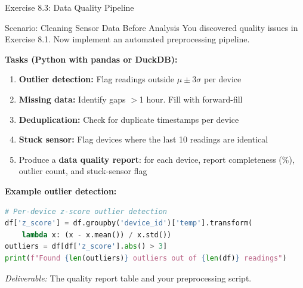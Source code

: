 \documentclass[aspectratio=169,11pt]{beamer}
\begin{document}
\begin{frame}[fragile]{Exercise 8.3: Data Quality Pipeline}
    \begin{block}{Scenario: Cleaning Sensor Data Before Analysis}
        You discovered quality issues in Exercise 8.1. Now implement an automated preprocessing pipeline.
    \end{block}

    \vspace{0.2cm}
    \textbf{Tasks (Python with pandas or DuckDB):}
    \begin{enumerate}
        \item \textbf{Outlier detection:} Flag readings outside $\mu \pm 3\sigma$ per device
        \item \textbf{Missing data:} Identify gaps $>$1 hour. Fill with forward-fill
        \item \textbf{Deduplication:} Check for duplicate timestamps per device
        \item \textbf{Stuck sensor:} Flag devices where the last 10 readings are identical
        \item Produce a \textbf{data quality report}: for each device, report completeness (\%), outlier count, and stuck-sensor flag
    \end{enumerate}

    \vspace{0.1cm}
    \textbf{Example outlier detection:}
\begin{lstlisting}[language=Python]
# Per-device z-score outlier detection
df['z_score'] = df.groupby('device_id')['temp'].transform(
    lambda x: (x - x.mean()) / x.std())
outliers = df[df['z_score'].abs() > 3]
print(f"Found {len(outliers)} outliers out of {len(df)} readings")
\end{lstlisting}

    {\footnotesize \textit{Deliverable:} The quality report table and your preprocessing script.}
\end{frame}
\end{document}
